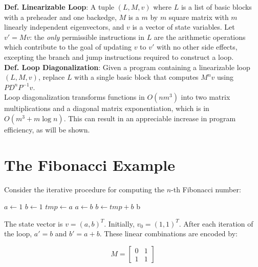 \documentclass[10pt]{article}
\begin{document}
\noindent
\textbf{Def. Linearizable Loop}: A tuple $(L, M, v)$ where $L$ is a list of
basic blocks with a preheader and one backedge, $M$ is a $m$ by $m$ square
matrix with $m$ linearly independent eigenvectors, and $v$ is a vector of
state variables. Let $v' = Mv$: the \emph{only} permissible instructions in
$L$ are the arithmetic operations which contribute to the goal of updating
$v$ to $v'$ with no other side effects, excepting the branch and jump
instructions required to construct a loop. \\

\noindent
\textbf{Def. Loop Diagonalization}: Given a program containing a linearizable
loop $(L, M, v)$, replace $L$ with a single basic block that computes $M^n
v$ using $PD^nP^{-1}v$. \\

Loop diagonalization transforms functions in $O(nm^3)$ into two matrix
multiplications and a diagonal matrix exponentiation, which is in $O(m^3 +
m\log n)$. This can result in an appreciable increase in program efficiency,
as will be shown.

\section{The Fibonacci Example}

Consider the iterative procedure for computing the $n$-th Fibonacci number:

\begin{center}
    \parbox{4cm}{
        \begin{algorithmic}
                \State $a\gets 1$
                \State $b\gets 1$
                    \State $tmp\gets a$
                    \State $a\gets b$
                    \State $b\gets tmp + b$
                \EndFor
                \State \Return b
            \EndFunction
        \end{algorithmic}
    }
\end{center}

The state vector is $v = (a, b)^T$. Initially, $v_0 = (1, 1)^T$. After each
iteration of the loop, $a' = b$ and $b' = a + b$. These linear combinations
are encoded by:

\begin{displaymath}
M = \begin{bmatrix}
        0 & 1 \\
        1 & 1
    \end{bmatrix}
\end{displaymath}
\end{document}
